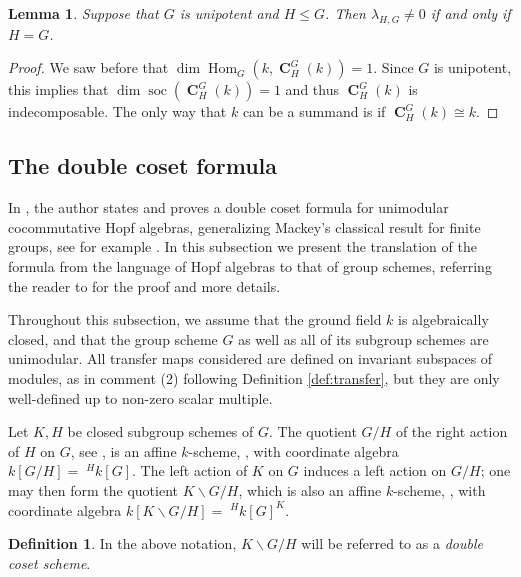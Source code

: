 \documentclass[12pt]{amsart}
\newtheorem{lemma}[theorem]{Lemma}
\theoremstyle{definition}
\newtheorem{definition}[theorem]{Definition}
\DeclareMathOperator{\coind}{\mathbf{C}}
\DeclareMathOperator{\Hom}{Hom}
\DeclareMathOperator{\soc}{soc}
\begin{document}
		\begin{lemma}
			Suppose that $G$ is unipotent and $H \leq G$. Then $\lambda_{H,G} \ne 0$ if and only if $H=G$.
			\end{lemma}
		
	\begin{proof}
		We saw before that $\dim \Hom_G(k,\coind_H^G(k))=1$. Since $G$ is unipotent, this implies that $\dim \soc (\coind^G_H(k))=1$ and thus $\coind^G_H(k)$ is indecomposable. The only way that $k$ can be a summand is if $\coind^G_H(k) \cong k$.
		\end{proof}
		

	


\subsection{The double coset formula}\label{sec:Mackey}
In \cite{MR1375579}, the author states and proves a double coset formula for unimodular cocommutative Hopf algebras, generalizing Mackey's classical result for finite groups, see for example \cite[3.6.3(iv)]{benson}. In this subsection we present the translation of the formula from the language of Hopf algebras to that of group schemes, referring the reader to \cite[4.18 \& 4.19]{MR1375579} for the proof and more details.

Throughout this subsection, we assume that the ground field $k$ is algebraically closed, and that the group scheme $G$ as well as all of its subgroup schemes are unimodular. All transfer maps considered are defined on invariant subspaces of modules, as in comment (2) following Definition \ref{def:transfer}, but they are only well-defined up to non-zero scalar multiple.


Let $K,H$ be closed subgroup schemes of $G$. The quotient $G/H$ of the right action of $H$ on $G$, see \cite[I.5.5-I.5.6]{MR2015057}, is an affine $k$-scheme, \cite[III.\S3.5.4]{MR0302656}, with coordinate algebra $k[G/H]=\;^Hk[G]$. The left action of $K$ on $G$ induces a left action on $G/H$; one may then form the quotient $K \backslash G / H$, which is also an affine $k$-scheme, \cite[III.12, Theorem 1]{MumfordAbelian}, with coordinate algebra $k[K \backslash G / H]=\;^Hk[G]^K$.
\begin{definition}
	In the above notation, $K \backslash G / H$ will be referred to as a {\em double coset scheme}.
\end{definition}
\end{document}
